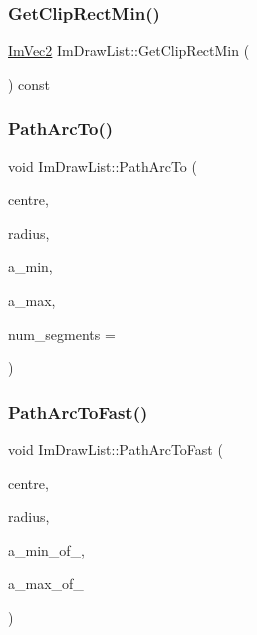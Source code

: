 \hypertarget{struct_im_draw_list_a9d83896d3eb434a9e1072d56523a2754}{}\label{struct_im_draw_list_a9d83896d3eb434a9e1072d56523a2754} 
\subsubsection{\texorpdfstring{Get\+Clip\+Rect\+Min()}{GetClipRectMin()}}
{\footnotesize\ttfamily \hyperlink{struct_im_vec2}{Im\+Vec2} Im\+Draw\+List\+::\+Get\+Clip\+Rect\+Min (\begin{DoxyParamCaption}{ }\end{DoxyParamCaption}) const}

\hypertarget{struct_im_draw_list_acb69ef7febcc54c9e5e09d2460c85b61}{}\label{struct_im_draw_list_acb69ef7febcc54c9e5e09d2460c85b61} 
\subsubsection{\texorpdfstring{Path\+Arc\+To()}{PathArcTo()}}
{\footnotesize\ttfamily void Im\+Draw\+List\+::\+Path\+Arc\+To (\begin{DoxyParamCaption}\item[{const \hyperlink{struct_im_vec2}{Im\+Vec2} \&}]{centre,  }\item[{float}]{radius,  }\item[{float}]{a\+\_\+min,  }\item[{float}]{a\+\_\+max,  }\item[{int}]{num\+\_\+segments = {} }\end{DoxyParamCaption})}

\hypertarget{struct_im_draw_list_a713cca3862e88aa1ee671db1c4cf6bdb}{}\label{struct_im_draw_list_a713cca3862e88aa1ee671db1c4cf6bdb} 
\subsubsection{\texorpdfstring{Path\+Arc\+To\+Fast()}{PathArcToFast()}}
{\footnotesize\ttfamily void Im\+Draw\+List\+::\+Path\+Arc\+To\+Fast (\begin{DoxyParamCaption}\item[{const \hyperlink{struct_im_vec2}{Im\+Vec2} \&}]{centre,  }\item[{float}]{radius,  }\item[{int}]{a\+\_\+min\+\_\+of\+\_,  }\item[{int}]{a\+\_\+max\+\_\+of\+\_ }\end{DoxyParamCaption})}

